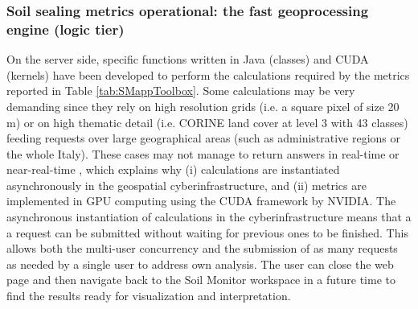 \documentclass[APA,LATO1COL,doublespace]{WileyNJD-v2}
\newcommand{\update}[1]{\emph{\textcolor{blue}{#1}}}     %
\begin{document}
\subsubsection{ Soil sealing metrics operational: the fast geoprocessing engine (logic tier) } %
\label{sec:logicTier}
On the server side, specific functions written in Java (classes) and CUDA (kernels) have been developed to perform the calculations required by the metrics reported in Table \ref{tab:SMappToolbox}. 
Some calculations may be very demanding since they rely on high resolution grids (i.e. a square pixel of size 20 m) or on high thematic detail (i.e. CORINE land cover at level 3 with 43 classes) feeding requests over large geographical areas (such as administrative regions or the whole Italy).
These cases may not manage to return answers in real-time or near-real-time
, which explains why 
(i) calculations are instantiated asynchronously in the geospatial cyberinfrastructure, and
(ii) metrics are implemented in GPU computing using the CUDA framework by NVIDIA.
The asynchronous instantiation of calculations in the cyberinfrastructure means that a a request can be submitted without waiting for previous ones to be finished.
This allows both the multi-user concurrency and the submission of as many requests as needed by a single user to address own analysis.
The user can close the web page and then navigate back to the Soil Monitor workspace in a future time to find the results ready for visualization and interpretation.
\end{document}
